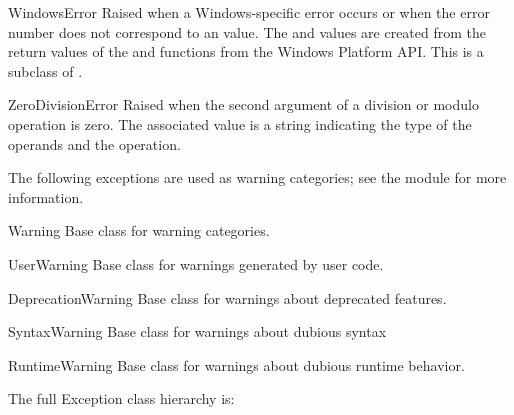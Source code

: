 \begin{excdesc}{WindowsError}
  Raised when a Windows-specific error occurs or when the error number
  does not correspond to an  value.  The
   and  values are created from the
  return values of the  and
   functions from the Windows Platform API.
  This is a subclass of .
\end{excdesc}

\begin{excdesc}{ZeroDivisionError}
  Raised when the second argument of a division or modulo operation is
  zero.  The associated value is a string indicating the type of the
  operands and the operation.
\end{excdesc}



The following exceptions are used as warning categories; see the
 module for more information.

\begin{excdesc}{Warning}
Base class for warning categories.
\end{excdesc}

\begin{excdesc}{UserWarning}
Base class for warnings generated by user code.
\end{excdesc}

\begin{excdesc}{DeprecationWarning}
Base class for warnings about deprecated features.
\end{excdesc}

\begin{excdesc}{SyntaxWarning}
Base class for warnings about dubious syntax
\end{excdesc}

\begin{excdesc}{RuntimeWarning}
Base class for warnings about dubious runtime behavior.
\end{excdesc}

The full Exception class hierarchy is:

